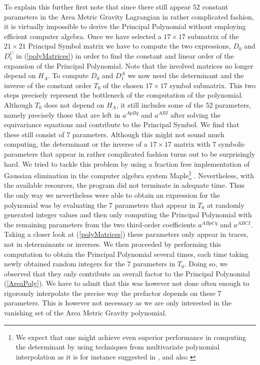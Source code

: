 \documentclass[a4paper,12pt, DIV=14, BCOR=5mm, twoside, headsepline, numbers=noenddot]{scrbook}
\begin{document}
To explain this further first note that since there still appear $52$ constant parameters in the Area Metric Gravity Lagrangian in rather complicated fashion, it is virtually impossible to derive the Principal Polynomial without employing efficient computer algebra. Once we have selected a $17 \times 17$ submatrix of the $21 \times 21$ Principal Symbol matrix we have to compute the two expressions, $D_0$ and $D_{1}^C$ in (\ref{polyMatrices}) in order to find the constant and linear order of the expansion of the Principal Polynomial. Note that the involved matrices no longer depend on $H_A$. To compute $D_0$ and $D_1^A$ we now need the determinant and the inverse of the constant order $T_0$ of the chosen $17 \times 17$ symbol submatrix. This two steps precisely represent the bottleneck of the computation of the polynomial. Although $T_0$ does not depend on $H_A$, it still includes some of the $52$ parameters, namely precisely those that are left in $a^{ApBq}$ and $a^{ABI}$ after solving the equivariance equations and contribute to the Principal Symbol. We find that these still consist of $7$ parameters. Although this might not sound much computing, the determinant or the inverse of a $17 \times 17$ matrix with $7$ symbolic parameters that appear in rather complicated fashion turns out to be surprisingly hard. We tried to tackle this problem by using a fraction free implementation of Gaussian elimination in the computer algebra system Maple\footnote{We expect that one might achieve even superior performance in computing the determinant by using techniques from multivariate polynomial interpolation as it is for instance suggested in \cite{Qin2018}, \cite{MARCO2004749} and also \cite{articleDet}} \cite{Maple}. Nevertheless, with the available resources, the program did not terminate in adequate time. Thus the only way we nevertheless were able to obtain an expression for the polynomial was by evaluating the $7$ parameters that appear in $T_0$ at randomly generated integer values and then only computing the Principal Polynomial with the remaining parameters from the two third-order coefficients $a^{ABpCq}$ and $a^{ABCI}$. Taking a closer look at (\ref{polyMatrices}) these parameters only appear in traces, not in determinants or inverses. We then proceeded by performing this computation to obtain the Principal Polynomial several times, each time taking newly obtained random integers for the $7$ parameters in $T_0$. Doing so, we observed that they only contribute an overall factor to the Principal Polynomial (\ref{AreaPoly}). We have to admit that this was however not done often enough to rigorously interpolate the precise way the prefactor depends on these $7$ parameters. This is however not necessary as we are only interested in the vanishing set of the Area Metric Gravity polynomial. 
\end{document}
